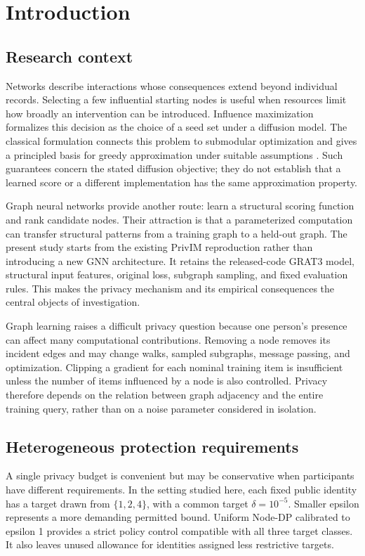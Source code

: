 \chapter{Introduction}\label{ch:intro}
\section{Research context}
Networks describe interactions whose consequences extend beyond individual records. Selecting a few influential starting nodes is useful when resources limit how broadly an intervention can be introduced. Influence maximization formalizes this decision as the choice of a seed set under a diffusion model. The classical formulation connects this problem to submodular optimization and gives a principled basis for greedy approximation under suitable assumptions \cite{kempe2003}. Such guarantees concern the stated diffusion objective; they do not establish that a learned score or a different implementation has the same approximation property.

Graph neural networks provide another route: learn a structural scoring function and rank candidate nodes. Their attraction is that a parameterized computation can transfer structural patterns from a training graph to a held-out graph. The present study starts from the existing PrivIM reproduction rather than introducing a new GNN architecture. It retains the released-code GRAT3 model, structural input features, original loss, subgraph sampling, and fixed evaluation rules. This makes the privacy mechanism and its empirical consequences the central objects of investigation.

Graph learning raises a difficult privacy question because one person's presence can affect many computational contributions. Removing a node removes its incident edges and may change walks, sampled subgraphs, message passing, and optimization. Clipping a gradient for each nominal training item is insufficient unless the number of items influenced by a node is also controlled. Privacy therefore depends on the relation between graph adjacency and the entire training query, rather than on a noise parameter considered in isolation.

\section{Heterogeneous protection requirements}
A single privacy budget is convenient but may be conservative when participants have different requirements. In the setting studied here, each fixed public identity has a target drawn from $\{1,2,4\}$, with a common target $\delta=10^{-5}$. Smaller epsilon represents a more demanding permitted bound. Uniform Node-DP calibrated to epsilon 1 provides a strict policy control compatible with all three target classes. It also leaves unused allowance for identities assigned less restrictive targets.

